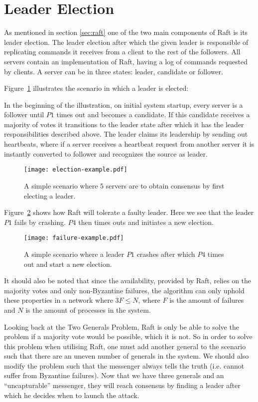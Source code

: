 \section{Leader Election} %
\label{sec:leader_election}
As mentioned in section \ref{sec:raft} one of the two main components of Raft is its leader election. The leader election after which the given leader is responsible of replicating commands it receives from a client to the rest of the followers. All servers contain an implementation of Raft, having a log of commands requested by clients. A server can be in three states: leader, candidate or follower.

Figure~\ref{fig:election_example} illustrates the scenario in which a leader is elected:

In the beginning of the illustration, on initial system startup, every server is a follower until $P1$ times out and becomes a candidate. If this candidate receives a majority of votes it transitions to the leader state after which it has the leader responsibilities described above. The leader claims its leadership by sending out heartbeats, where if a server receives a heartbeat request from another server it is instantly converted to follower and recognizes the source as leader.

\begin{figure}[ht!]
\centering
\texttt{[image: election-example.pdf]}
\caption{A simple scenario where 5 servers are to obtain consensus by first electing a leader.}
\label{fig:election_example}
\end{figure}

Figure~\ref{fig:failure_example} shows how Raft will tolerate a faulty leader. Here we see that the leader $P1$ fails by crashing. $P4$ then times outs and initiates a new election.

\begin{figure}[ht!]
\centering
\texttt{[image: failure-example.pdf]}
\caption{A simple scenario where a leader $P1$ crashes after which $P4$ times out and start a new election.}
\label{fig:failure_example}
\end{figure}

It should also be noted that since the availability, provided by Raft, relies on the majority votes and only non-Byzantine failures, the algorithm can only uphold these properties in a network where $3F \leq N$, where $F$ is the amount of failures and $N$ is the amount of processes in the system.~\cite{Fischer}

Looking back at the Two Generals Problem, Raft is only be able to solve the problem if a majority vote would be possible, which it is not. So in order to solve this problem when utilising Raft, one must add another general to the scenario such that there are an uneven number of generals in the system. We should also modify the problem such that the messenger always tells the truth (i.e. cannot suffer from Byzantine failures). Now that we have three generals and an ``uncapturable'' messenger, they will reach consensus by finding a leader after which he decides when to launch the attack.

